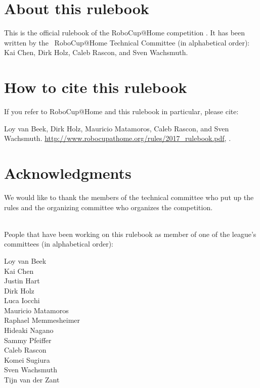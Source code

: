 


\section*{About this rulebook}
This is the official rulebook of the RoboCup@Home competition \YEAR.
It has been written by the \YEAR ~RoboCup@Home Technical Committee (in alphabetical order): 
Kai Chen,
Dirk Holz,
Caleb Rascon, and
Sven Wachsmuth.

\section*{How to cite this rulebook}
If you refer to RoboCup@Home and this rulebook in particular, please cite:

Loy van Beek, Dirk Holz, Mauricio Matamoros, Caleb Rascon, and Sven Wachsmuth. 
\url{http://www.robocupathome.org/rules/2017_rulebook.pdf}, \YEAR.



\section*{Acknowledgments}
\label{sec:acknowledgments}
We would like to thank the members of the technical committee who put up the rules and the organizing committee who organizes the competition.  

~\\\noindent People that have been working on this rulebook as member of one of the league's committees (in alphabetical order):
\begin{multicols}{3}%
\noindent%
Loy van Beek\\
Kai Chen\\
Justin Hart\\
\columnbreak
Dirk Holz\\
Luca Iocchi\\
Mauricio Matamoros\\
Raphael Memmesheimer\\
Hideaki Nagano\\
\columnbreak
Sammy Pfeiffer\\
Caleb Rascon\\
Komei Sugiura\\
Sven Wachsmuth\\
Tijn van der Zant\\
\end{multicols}

